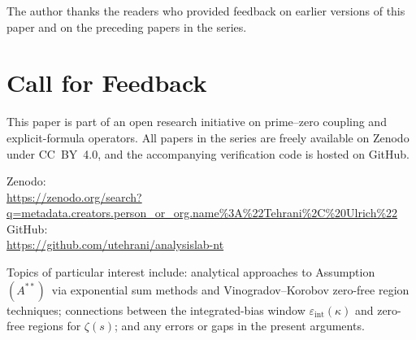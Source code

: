 \documentclass[11pt]{article}
\newcommand{\Astar}{\ensuremath{(A^{**})}}  %
\begin{document}
The author thanks the readers who provided feedback on earlier
versions of this paper and on the preceding papers in the series.

\section*{Call for Feedback}

This paper is part of an open research initiative on prime--zero
coupling and explicit-formula operators.
All papers in the series are freely available on Zenodo under CC~BY~4.0,
and the accompanying verification code is hosted on GitHub.

{\raggedright
Zenodo:\\
\url{https://zenodo.org/search?q=metadata.creators.person_or_org.name\%3A\%22Tehrani\%2C\%20Ulrich\%22}\\
GitHub:\\
\url{https://github.com/utehrani/analysislab-nt}
\par}

Topics of particular interest include:
analytical approaches to Assumption~\Astar\ via exponential sum methods
and Vinogradov--Korobov zero-free region techniques;
connections between the integrated-bias window $\varepsilon_{\mathrm{int}}(\kappa)$
and zero-free regions for $\zeta(s)$;
and any errors or gaps in the present arguments.
\end{document}
